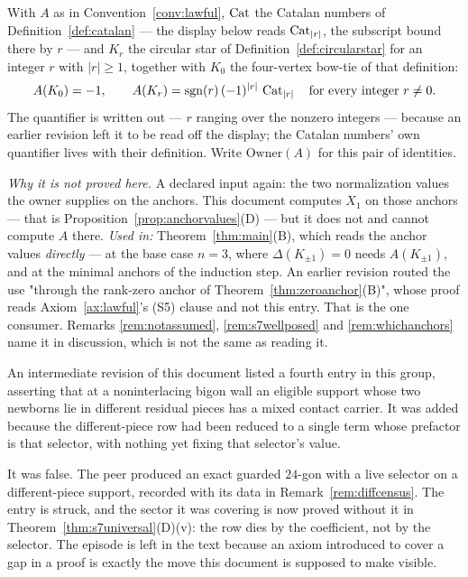 \begin{axiom}\label{ax:ownerlist}
With $A$ as in Convention~\ref{conv:lawful}, $\operatorname{Cat}$ the Catalan numbers of
Definition~\ref{def:catalan} --- the display below reads $\operatorname{Cat}_{|r|}$, the
subscript bound there by $r$ --- and $K_r$ the circular star of
Definition~\ref{def:circularstar} for an integer $r$ with $|r|\geq1$, together
with $K_0$ the four-vertex bow-tie of that definition:
\[
   A(K_0)=-1,\qquad
   A(K_r)=\operatorname{sgn}(r)\,(-1)^{|r|}\,\operatorname{Cat}_{|r|}\quad\text{for every integer }r\neq0 .
\]
The quantifier is written out --- $r$ ranging over the nonzero integers ---
because an earlier revision left it to be read off the display; the Catalan
numbers' own quantifier lives with their definition.
Write $\mathrm{Owner}(A)$ for this pair of identities.

\emph{Why it is not proved here.} A declared input again: the two normalization
values the owner supplies on the anchors. This document computes $X_1$ on those
anchors --- that is Proposition~\ref{prop:anchorvalues}(D) --- but it does not and
cannot compute $A$ there.
\emph{Used in:} Theorem~\ref{thm:main}(B), which reads the anchor values
\emph{directly} --- at the base case $n=3$, where $\Delta(K_{\pm1})=0$ needs
$A(K_{\pm1})$, and at the minimal anchors of the induction step. An earlier
revision routed the use "through the rank-zero anchor of
Theorem~\ref{thm:zeroanchor}(B)", whose proof reads Axiom~\ref{ax:lawful}'s (S5)
clause and not this entry. That is the one consumer. Remarks
\ref{rem:notassumed}, \ref{rem:s7wellposed} and \ref{rem:whichanchors} name it
in discussion, which is not the same as reading it.
\end{axiom}

\begin{remark}\label{rem:diffdeadremoved}
An intermediate revision of this document listed a fourth entry in this group,
asserting that at a noninterlacing bigon wall an eligible support whose two
newborns lie in different residual pieces has a mixed contact carrier. It was
added because the different-piece row had been reduced to a single term whose
prefactor is that selector, with nothing yet fixing that selector's value.

It was false. The peer produced an exact guarded $24$-gon with a live
selector on a different-piece support, recorded with its data in
Remark~\ref{rem:diffcensus}. The entry is struck, and the sector it was
covering is now proved without it in Theorem~\ref{thm:s7universal}(D)(v): the row dies
by the coefficient, not by the selector. The episode is left in the text
because an axiom introduced to cover a gap in a proof is exactly the move
this document is supposed to make visible.
\end{remark}

